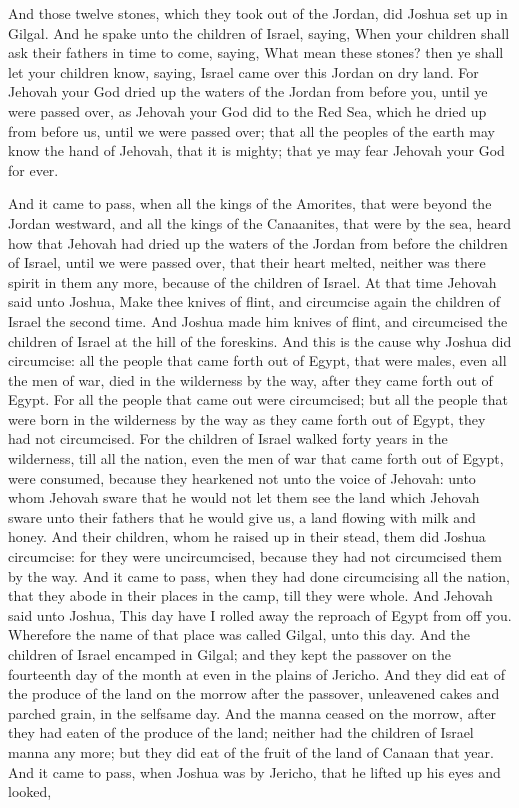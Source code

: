 And those twelve stones, which they took out of the Jordan, did Joshua set up in Gilgal. And he spake unto the children of Israel, saying, When your children shall ask their fathers in time to come, saying, What mean these stones? then ye shall let your children know, saying, Israel came over this Jordan on dry land. For Jehovah your God dried up the waters of the Jordan from before you, until ye were passed over, as Jehovah your God did to the Red Sea, which he dried up from before us, until we were passed over; that all the peoples of the earth may know the hand of Jehovah, that it is mighty; that ye may fear Jehovah your God for ever. 

And it came to pass, when all the kings of the Amorites, that were beyond the Jordan westward, and all the kings of the Canaanites, that were by the sea, heard how that Jehovah had dried up the waters of the Jordan from before the children of Israel, until we were passed over, that their heart melted, neither was there spirit in them any more, because of the children of Israel.  At that time Jehovah said unto Joshua, Make thee knives of flint, and circumcise again the children of Israel the second time. And Joshua made him knives of flint, and circumcised the children of Israel at the hill of the foreskins. And this is the cause why Joshua did circumcise: all the people that came forth out of Egypt, that were males, even all the men of war, died in the wilderness by the way, after they came forth out of Egypt. For all the people that came out were circumcised; but all the people that were born in the wilderness by the way as they came forth out of Egypt, they had not circumcised. For the children of Israel walked forty years in the wilderness, till all the nation, even the men of war that came forth out of Egypt, were consumed, because they hearkened not unto the voice of Jehovah: unto whom Jehovah sware that he would not let them see the land which Jehovah sware unto their fathers that he would give us, a land flowing with milk and honey. And their children, whom he raised up in their stead, them did Joshua circumcise: for they were uncircumcised, because they had not circumcised them by the way. And it came to pass, when they had done circumcising all the nation, that they abode in their places in the camp, till they were whole. And Jehovah said unto Joshua, This day have I rolled away the reproach of Egypt from off you. Wherefore the name of that place was called Gilgal, unto this day.  And the children of Israel encamped in Gilgal; and they kept the passover on the fourteenth day of the month at even in the plains of Jericho. And they did eat of the produce of the land on the morrow after the passover, unleavened cakes and parched grain, in the selfsame day. And the manna ceased on the morrow, after they had eaten of the produce of the land; neither had the children of Israel manna any more; but they did eat of the fruit of the land of Canaan that year.  And it came to pass, when Joshua was by Jericho, that he lifted up his eyes and looked, 